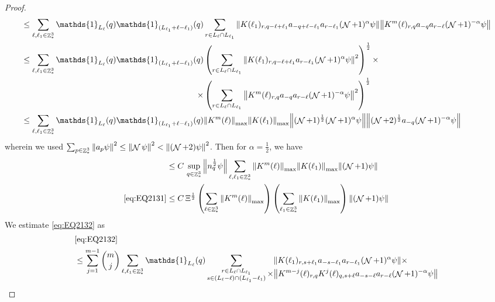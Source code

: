 \documentclass[sn-mathphys, Numbered ,a4paper]{sn-jnl}%
\DeclareMathOperator{\Z}{\mathbb{Z}}
\DeclareMathOperator{\NN}{\mathcal{N}}
\newcommand{\half}{\frac{1}{2}}
\theoremstyle{plain}
\theoremstyle{definition}
\theoremstyle{remark}
\theoremstyle{plain}
\theoremstyle{definition}
\theoremstyle{remark}
\begin{document}
\begin{proof}
\begin{alignat}{2}
    &\leq \sum\limits_{\ell, \ell_1\in \Z^3_*} \mathds{1}_{L_{\ell}}(q) \mathds{1}_{(L_{\ell_1}+\ell-\ell_1)}(q) \sum\limits_{r\in L_{\ell} \cap L_{\ell_1}} \norm{ K(\ell_1)_{r,q-\ell+\ell_1} a_{-q+\ell-\ell_1} a_{r-\ell_1}(\NN+1)^{\alpha}\psi}\norm{ K^m(\ell)_{r,q} a_{-q}a_{r-\ell} (\NN+1)^{-\alpha} \psi }\nonumber\\
    &\leq \sum\limits_{\ell, \ell_1\in \Z^3_*} \mathds{1}_{L_{\ell}}(q) \begin{aligned}[t]
     \mathds{1}_{(L_{\ell_1}+\ell-\ell_1)}(q) &\left(\sum\limits_{r\in L_{\ell} \cap L_{\ell_1}} \norm{ K(\ell_1)_{r,q-\ell+\ell_1} a_{r-\ell_1}(\NN+1)^{\alpha} \psi}^2\right)^\half \times\nonumber\\ \times &\left(\sum\limits_{r\in L_{\ell} \cap L_{\ell_1}} \norm{ K^m(\ell)_{r,q} a_{-q}a_{r-\ell} (\NN+1)^{-\alpha} \psi }^2 \right)^\half \end{aligned}\nonumber\\
    &\leq \sum\limits_{\ell, \ell_1\in \Z^3_*} \mathds{1}_{L_{\ell}}(q) \mathds{1}_{(L_{\ell_1}+\ell-\ell_1)}(q)  \norm{K^m(\ell)}_{\mathrm{max}} \norm{ K(\ell_1)}_{\mathrm{max}} \norm{ (\NN+1)^\half(\NN+1)^{\alpha} \psi} \norm{ (\NN+2)^\half a_{-q} (\NN+1)^{-\alpha} \psi }\nonumber
\end{alignat} 
wherein we used $\sum_{p\in \Z^3_*}\norm{a_p \psi}^2\leq\norm{\NN\psi}^2<\norm{(\NN+2)\psi}^2$. Then for $\alpha =  \half $, we have 
\begin{align}
	&\leq C\, \sup\limits_{q\in \Z^3_*}\norm{n_q^\half \psi } \sum\limits_{\ell, \ell_1\in \Z^3_*}   \norm{K^m(\ell)}_{\mathrm{max}} \norm{ K(\ell_1)}_{\mathrm{max}}   \norm{ (\NN+1) \psi} \nonumber\\
	\eqref{eq:EQ2131}&\leq C\, \Xi^\half \left(\sum\limits_{\ell\in \Z^3_*} \norm{K^m(\ell)}_{\mathrm{max}}\right)\left(  \sum\limits_{ \ell_1\in \Z^3_*}  \norm{ K(\ell_1)}_{\mathrm{max}} \right) \norm{ (\NN+1) \psi}\label{eq:estEQ2131} 
\end{align}  
We estimate \eqref{eq:EQ2132} as
\begin{align}
	&\eqref{eq:EQ2132}\nonumber\\
    &\leq \sum\limits_{j=1}^{m-1} {{m}\choose j} \sum\limits_{\ell, \ell_1\in \Z^3_*}\mathds{1}_{L_{\ell}}(q) \sum\limits_{\substack{r\in L_{\ell} \cap L_{\ell_1}\\ s \in (L_{\ell}-\ell) \cap (L_{\ell_1}-\ell_1)}} \begin{aligned}[t] &\norm{ K(\ell_1)_{r,s+\ell_1}a_{-s-\ell_1} a_{r-\ell_1} (\NN+1)^{\alpha}\psi}\nonumber \times \\ \times&\norm{ K^{m-j}(\ell)_{r,q} K^{j}(\ell)_{q,s+\ell} a_{-s-\ell}a_{r-\ell} (\NN+1)^{-\alpha} \psi }\end{aligned} \nonumber\\

\end{align}
\end{proof}
\end{document}
